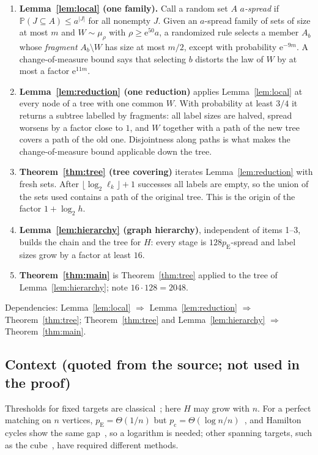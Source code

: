 \documentclass[11pt]{article}
\numberwithin{equation}{section}
\newcommand{\PP}{\mathbb P}
\newcommand{\pc}{p_{\mathrm c}}
\newcommand{\pE}{p_{\mathrm E}}
\newcommand{\ee}{\mathrm e}
\begin{document}
\begin{enumerate}[label=\arabic*.,itemsep=2pt,topsep=3pt]
 \item \textbf{Lemma~\ref{lem:local} (one family).} Call a random set $A$
 \emph{$a$-spread} if $\PP(J\subseteq A)\le a^{|J|}$ for all nonempty $J$.
 Given an $a$-spread family of sets of size at most $m$ and
 $W\sim\mu_\rho$ with $\rho\ge\ee^{50}a$, a randomized rule selects a
 member $A_b$ whose \emph{fragment} $A_b\setminus W$ has size at most
 $m/2$, except with probability $\ee^{-9m}$. A change-of-measure bound
 says that selecting $b$ distorts the law of $W$ by at most
 a factor $\ee^{11m}$.
 \item \textbf{Lemma~\ref{lem:reduction} (one reduction)} applies
 Lemma~\ref{lem:local} at every node of a tree with one common $W$. With
 probability at least $3/4$ it returns a subtree labelled by fragments:
 all label sizes are halved, spread worsens by a factor close to $1$, and
 $W$ together with a path of the new tree covers a path of the old one.
 Disjointness along paths is what makes the change-of-measure bound
 applicable down the tree.
 \item \textbf{Theorem~\ref{thm:tree} (tree covering)} iterates
 Lemma~\ref{lem:reduction} with fresh sets. After
 $\lfloor\log_2\ell_k\rfloor+1$ successes all labels are empty, so the
 union of the sets used contains a path of the original tree. This is the
 origin of the factor $1+\log_2h$.
 \item \textbf{Lemma~\ref{lem:hierarchy} (graph hierarchy)}, independent
 of items 1--3, builds the chain and the tree for $H$: every stage is
 $128\pE$-spread and label sizes grow by a factor at least $16$.
 \item \textbf{Theorem~\ref{thm:main}} is Theorem~\ref{thm:tree} applied
 to the tree of Lemma~\ref{lem:hierarchy}; note $16\cdot128=2048$.
\end{enumerate}
Dependencies: Lemma~\ref{lem:local} $\Rightarrow$
Lemma~\ref{lem:reduction} $\Rightarrow$ Theorem~\ref{thm:tree};
Theorem~\ref{thm:tree} and Lemma~\ref{lem:hierarchy} $\Rightarrow$
Theorem~\ref{thm:main}.

\subsection*{Context (quoted from the source; not used in the proof)}

Thresholds for fixed targets are classical~\cite{ER60,Bollobas81}; here
$H$ may grow with $n$. For a perfect matching on $n$ vertices,
$\pE=\Theta(1/n)$ but $\pc=\Theta(\log n/n)$~\cite{ER66,KK07}, and
Hamilton cycles show the same gap~\cite{KK07}, so a logarithm is needed;
other spanning targets, such as the cube~\cite{Riordan00}, have required
different methods.
\end{document}
